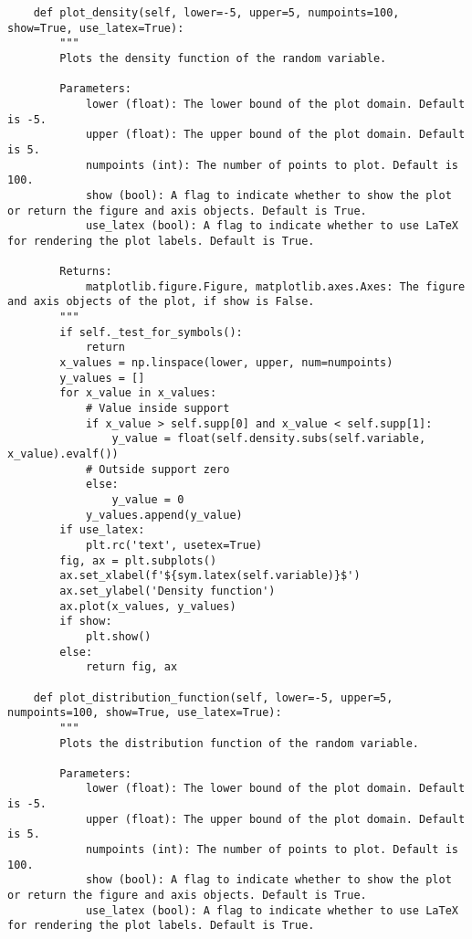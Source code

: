 \begin{small}
\begin{lstlisting}
    def plot_density(self, lower=-5, upper=5, numpoints=100, show=True, use_latex=True):
        """
        Plots the density function of the random variable.

        Parameters:
            lower (float): The lower bound of the plot domain. Default is -5.
            upper (float): The upper bound of the plot domain. Default is 5.
            numpoints (int): The number of points to plot. Default is 100.
            show (bool): A flag to indicate whether to show the plot or return the figure and axis objects. Default is True.
            use_latex (bool): A flag to indicate whether to use LaTeX for rendering the plot labels. Default is True.

        Returns:
            matplotlib.figure.Figure, matplotlib.axes.Axes: The figure and axis objects of the plot, if show is False.
        """
        if self._test_for_symbols():
            return
        x_values = np.linspace(lower, upper, num=numpoints)
        y_values = []
        for x_value in x_values:
            # Value inside support
            if x_value > self.supp[0] and x_value < self.supp[1]:
                y_value = float(self.density.subs(self.variable, x_value).evalf())
            # Outside support zero
            else:
                y_value = 0
            y_values.append(y_value)
        if use_latex:
            plt.rc('text', usetex=True)
        fig, ax = plt.subplots()
        ax.set_xlabel(f'${sym.latex(self.variable)}$')
        ax.set_ylabel('Density function')
        ax.plot(x_values, y_values)
        if show:
            plt.show()
        else:
            return fig, ax

    def plot_distribution_function(self, lower=-5, upper=5, numpoints=100, show=True, use_latex=True):
        """
        Plots the distribution function of the random variable.

        Parameters:
            lower (float): The lower bound of the plot domain. Default is -5.
            upper (float): The upper bound of the plot domain. Default is 5.
            numpoints (int): The number of points to plot. Default is 100.
            show (bool): A flag to indicate whether to show the plot or return the figure and axis objects. Default is True.
            use_latex (bool): A flag to indicate whether to use LaTeX for rendering the plot labels. Default is True.


\end{lstlisting}
\end{small}
